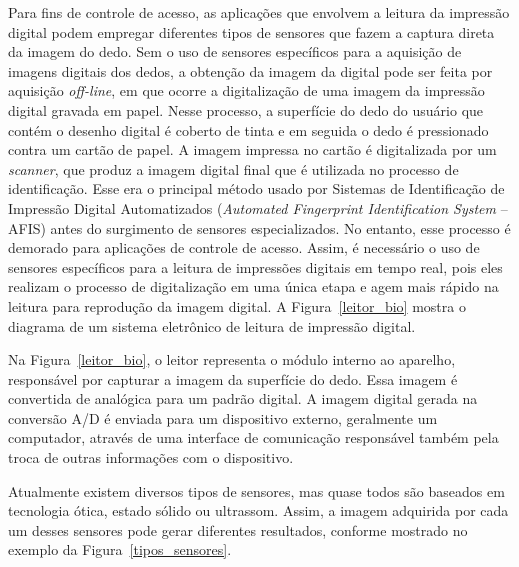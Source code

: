  Para fins de controle de acesso, as aplicações que envolvem a leitura da impressão digital podem empregar diferentes tipos de sensores que fazem a captura direta da imagem do dedo. Sem o uso de sensores específicos para a aquisição de imagens digitais dos dedos, a obtenção da imagem da digital pode ser feita por aquisição \textit{off-line}, em que ocorre a digitalização de uma imagem da impressão digital gravada em  papel.  Nesse processo, a superfície do dedo do usuário que contém o desenho digital é coberto de tinta e em seguida o dedo é pressionado contra um cartão de papel. A imagem impressa no cartão é digitalizada por um \textit{scanner}, que produz a imagem digital final que é utilizada no processo de identificação. Esse era o principal método usado por Sistemas de Identificação de Impressão Digital Automatizados (\textit{Automated Fingerprint Identification System} -- AFIS) antes do surgimento de sensores especializados. No entanto, esse processo é demorado para aplicações de controle de acesso. Assim, é necessário o uso de sensores específicos para a leitura de impressões digitais em tempo real, pois eles realizam o processo de digitalização em uma única etapa e agem mais rápido na leitura para reprodução da imagem digital. A Figura~\ref{leitor_bio} mostra o diagrama de um sistema eletrônico de leitura de impressão digital.



  Na Figura~\ref{leitor_bio}, o leitor representa o módulo interno ao aparelho, responsável por capturar a imagem da superfície do dedo. Essa imagem é convertida de analógica para um padrão digital. A imagem digital gerada na conversão A/D é enviada para um dispositivo externo, geralmente um computador, através de uma interface de comunicação responsável também pela troca de outras informações com o dispositivo. 
  
  
  Atualmente existem diversos tipos de sensores, mas quase todos são baseados em tecnologia ótica,  estado sólido ou ultrassom. Assim, a imagem adquirida por cada um desses sensores pode gerar diferentes resultados, conforme mostrado no exemplo da Figura~\ref{tipos_sensores}.


